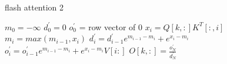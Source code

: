 \documentclass[a4paper]{article}
\begin{document}
    \begin{algorithm}
        \caption{flash attention 2}
        \label{fa2}
        \begin{algorithmic}[1]
            \State $m_0 = -\infty$
            \State $d^\prime_0 = 0 $
            \State $o^\prime_{0}$ = row vector  of 0
                \State $x_{i} = Q[k,:]K^T[:,i] $
                \State $m_{i} =  max(m_{i-1}, x_{i})$
                \State $d^{\prime}_i = d^{\prime}_{i-1} e^{m_{i-1}-m_{i}} + e^{x_i - m_i}$
                \State $o^\prime_{i} = o^\prime_{i-1}e^{m_{i-1}-m_{i}} + e^{x_i-m_i}V[i:]$
            \EndFor
            \State $O[k,:] =  \frac{o^\prime_{N}}{d^{\prime}_{N}}$
        \end{algorithmic}
    \end{algorithm}
\end{document}
